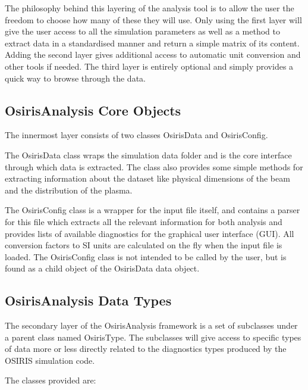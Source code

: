 The philosophy behind this layering of the analysis tool is to allow the user the freedom to choose how many of these
they will use. Only using the first layer will give the user access to all the simulation parameters as well as a method
to extract data in a standardised manner and return a simple matrix of its content. Adding the second layer gives
additional access to automatic unit conversion and other tools if needed. The third layer is entirely optional and
simply provides a quick way to browse through the data.

\subsection{OsirisAnalysis Core Objects}
\label{Tools:OALay1}

The innermost layer consists of two classes OsirisData and OsirisConfig.

The OsirisData class wraps the simulation data folder and is the core interface through which data is extracted. The
class also provides some simple methods for extracting information about the dataset like physical dimensions of the
beam and the distribution of the plasma.

The OsirisConfig class is a wrapper for the input file itself, and contains a parser for this file which extracts all
the relevant information for both analysis and provides lists of available diagnostics for the graphical user interface
(GUI). All conversion factors to SI units are calculated on the fly when the input file is loaded. The OsirisConfig
class is not intended to be called by the user, but is found as a child object of the OsirisData data object.

\subsection{OsirisAnalysis Data Types}
\label{Tools:OALay2}

The secondary layer of the OsirisAnalysis framework is a set of subclasses under a parent class named OsirisType. The
subclasses will give access to specific types of data more or less directly related to the diagnostics types produced by
the OSIRIS simulation code.

The classes provided are:

